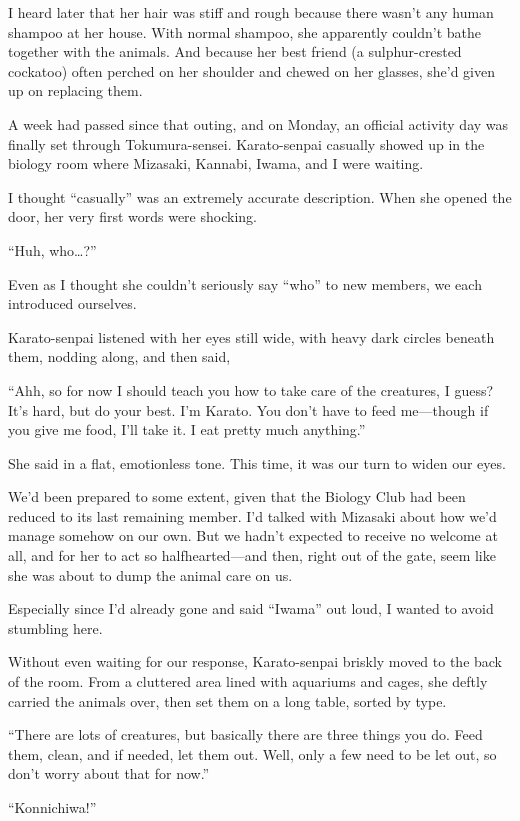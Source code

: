 \documentclass[
    a4paper,
    12pt,
    twoside,
    openany,
    UTF8,
    fontset=windows
]{ctexbook}
\begin{document}
I heard later that her hair was stiff and rough because there wasn't any human shampoo at her house. With normal shampoo, she apparently couldn't bathe together with the animals. And because her best friend (a sulphur-crested cockatoo) often perched on her shoulder and chewed on her glasses, she'd given up on replacing them.

A week had passed since that outing, and on Monday, an official activity day was finally set through Tokumura-sensei. Karato-senpai casually showed up in the biology room where Mizasaki, Kannabi, Iwama, and I were waiting.

I thought ``casually'' was an extremely accurate description. When she opened the door, her very first words were shocking.

``Huh, who\dots?''

Even as I thought she couldn't seriously say ``who'' to new members, we each introduced ourselves.

Karato-senpai listened with her eyes still wide, with heavy dark circles beneath them, nodding along, and then said,

``Ahh, so for now I should teach you how to take care of the creatures, I guess? It's hard, but do your best. I'm Karato. You don't have to feed me---though if you give me food, I'll take it. I eat pretty much anything.''

She said in a flat, emotionless tone. This time, it was our turn to widen our eyes.

We'd been prepared to some extent, given that the Biology Club had been reduced to its last remaining member. I'd talked with Mizasaki about how we'd manage somehow on our own. But we hadn't expected to receive no welcome at all, and for her to act so halfhearted---and then, right out of the gate, seem like she was about to dump the animal care on us.

Especially since I'd already gone and said ``Iwama'' out loud, I wanted to avoid stumbling here.

Without even waiting for our response, Karato-senpai briskly moved to the back of the room. From a cluttered area lined with aquariums and cages, she deftly carried the animals over, then set them on a long table, sorted by type.

``There are lots of creatures, but basically there are three things you do. Feed them, clean, and if needed, let them out. Well, only a few need to be let out, so don't worry about that for now.''

``Konnichiwa!''
\end{document}
